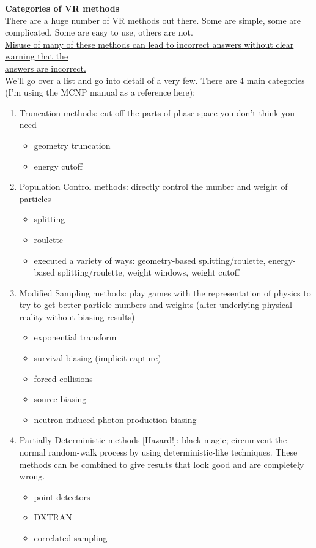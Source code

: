 \documentclass[12pt]{article}
\begin{document}
\textbf{Categories of VR methods}\\
There are a huge number of VR methods out there. Some are simple, some are complicated. Some are easy to use, others are not. \\
\underline{Misuse of many of these methods can lead to incorrect answers without clear warning that the} \\\underline{answers are incorrect.}\\
We'll go over a list and go into detail of a very few. There are 4 main categories (I'm using the MCNP manual as a reference here):
%
\begin{enumerate}
\item Truncation methods: cut off the parts of phase space you don't think you need
  \begin{itemize}
  \item geometry truncation
  \item energy cutoff
  \end{itemize}
  
\item Population Control methods: directly control the number and weight of particles
  \begin{itemize}
  \item splitting
  \item roulette
  \item executed a variety of ways: geometry-based splitting/roulette, energy-based splitting/roulette, weight windows, weight cutoff
  \end{itemize}

\item Modified Sampling methods: play games with the representation of physics to try to get better particle numbers and weights (alter underlying physical reality without biasing results)
  \begin{itemize}
  \item exponential transform
  \item survival biasing (implicit capture)
  \item forced collisions
  \item source biasing
  \item neutron-induced photon production biasing
  \end{itemize}

\item Partially Deterministic methods [Hazard!]: black magic; circumvent the normal random-walk process by using deterministic-like techniques. These methods can be combined to give results that look good and are completely wrong.
  \begin{itemize}
  \item point detectors
  \item DXTRAN
  \item correlated sampling
  \end{itemize}
\end{enumerate}
\end{document}
